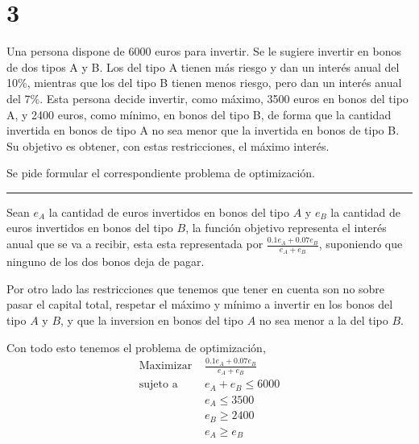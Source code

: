 \section*{3}

Una persona dispone de 6000 euros para invertir.
Se le sugiere invertir en bonos de dos tipos A y B.
Los del tipo A tienen más riesgo y dan un interés anual del 10\%,
mientras que los del tipo B tienen menos riesgo, pero dan un interés anual del 7\%.
Esta persona decide invertir, como máximo, 3500 euros en bonos del tipo A,
y 2400 euros, como mínimo, en bonos del tipo B,
de forma que la cantidad invertida en bonos de tipo A no sea menor que la invertida en bonos de tipo B.
Su objetivo es obtener, con estas restricciones, el máximo interés.

Se pide formular el correspondiente problema de optimización.

\noindent\rule{10cm}{0.4pt}

Sean $e_A$ la cantidad de euros invertidos en bonos del tipo $A$ y $e_B$ la cantidad de euros invertidos en bonos del tipo $B$,
la función objetivo representa el interés anual que se va a recibir,
esta esta representada por $\frac{0.1 e_A + 0.07 e_B}{e_A + e_B}$,
suponiendo que ninguno de los dos bonos deja de pagar.

Por otro lado las restricciones que tenemos que tener en cuenta son no sobre pasar el capital total,
respetar el máximo y mínimo a invertir en los bonos del tipo $A$ y $B$,
y que la inversion en bonos del tipo $A$ no sea menor a la del tipo $B$.

Con todo esto tenemos el problema de optimización,
\begin{equation}
\begin{aligned}
    \text{Maximizar }   & \frac{0.1 e_A + 0.07 e_B}{e_A + e_B} \\
    \text{sujeto a }    & e_A + e_B \leq 6000 \\
                        & e_A \leq 3500 \\
                        & e_B \geq 2400 \\
                        & e_A \geq e_B \\
\end{aligned}
\end{equation}
